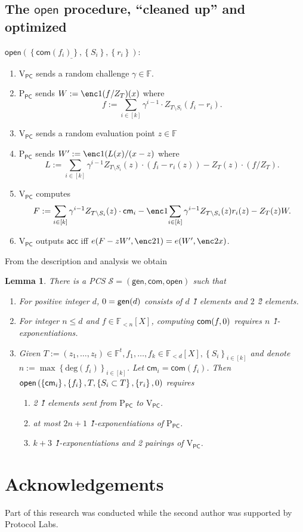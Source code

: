 \documentclass[11pt]{article} %
\newcommand{\F}{\ensuremath{\mathbb F}\xspace}
\newcommand{\com}{\ensuremath{\mathsf{com}}\xspace}
\newcommand{\cm}{\ensuremath{\mathsf{cm}}\xspace}
\newcommand{\open}{\ensuremath{\mathsf{open}}\xspace}
\renewcommand{\deg}{\ensuremath{\mathrm{deg}}\xspace}
\newcommand{\acc}{\ensuremath{\mathsf{acc}}\xspace}
\newcommand{\defeq}{:=}
\newcommand{\sett}[2]{\ensuremath{\set{#1}_{#2}}\xspace}
\newcommand{\gen}{\ensuremath{\mathsf{gen}}\xspace}
\newcommand{\prvpc}{\ensuremath{\mathrm{P_{\mathsf{PC}}}}\xspace}
\newcommand{\verpc}{\ensuremath{\mathrm{V_{\mathsf{PC}}}}\xspace}
\newcommand{\set}[1]{\ensuremath{\left\{#1\right\}}\xspace}
\newcommand{\polysofdeg}[1]{\ensuremath{\F_{< #1}[X]}\xspace}
\newcommand{\PCscheme}{\ensuremath{\mathscr{S}}\xspace}
\newtheorem{lemma}{Lemma}[section]
\begin{document}
 
 \subsection{The \open procedure, ``cleaned up'' and optimized}
 
$\underline{\open(\set{\com(f_i)},\set{S_i},\set{r_i})}$:
     \begin{enumerate}
    \item \verpc sends a random challenge $\gamma\in \F$.
    \item\label{stp:W} \prvpc sends $W\defeq \enc1{(f/Z_T)(x)}$ where
    \[f\defeq \sum_{i\in [k]} \gamma^{i-1}\cdot  Z_{T\setminus S_i}(f_i-r_i).\]
    \item \verpc sends a random evaluation point $z\in \F$
    \item\label{step:W'} \prvpc sends $W'\defeq \enc1{(L(x)/(x-z)}$ where
    \[L\defeq \sum_{i\in [k]} \gamma^{i-1}Z_{T\setminus S_i}(z)\cdot (f_i-r_i(z)) - Z_T(z)\cdot (f/Z_T).\]
    \item \verpc computes
     \[F\defeq \sum_{i\in [k]} \gamma^{i-1}  Z_{T\setminus S_i}(z)\cdot \cm_i - \enc1{\sum_{i\in [k]} \gamma^{i-1} Z_{T\setminus S_i}(z)r_i(z)} - Z_T(z)W.\]
    \item \verpc outputs \acc iff $e(F-zW',\enc2{1}) = e(W',\enc2{x})$.
    \end{enumerate}

From the description and analysis we obtain 
\begin{lemma}\label{lem:multikateG1}
There is a PCS $\PCscheme=(\gen,\com,\open)$ such that
  \begin{enumerate}
\item For positive integer $d$, $\srs0=\gen(d)$ consists of $d$ \G1 elements and $2$ \G2 elements.
  \item For integer $n\leq d$ and $f\in \polysofdeg{n}$, computing $\com(f,\srs0)$ requires $n$ \G1-exponentiations.
   \item Given $T \defeq (z_1,\ldots,z_t)\in \F^t, f_1,\ldots, f_k \in \polysofdeg{d}, \sett{S_i}{i\in [k]}$   and denote $n \defeq \max\sett{\deg(f_i)}{i\in [k]}$.
   Let $\cm_i = \com(f_i)$.
   Then $\open\left(\set{\cm_i},\set{f_i},T,\set{S_i\subset T},\set{r_i},\srs0 \right)$ requires

    \begin{enumerate}
    \item 2 \G1 elements sent from \prvpc to \verpc.
    \item at most $2n+1$ \G1-exponentiations of \prvpc.
    \item $k+3$ \G1-exponentiations and 2 pairings of \verpc.
\end{enumerate}
\end{enumerate}


\end{lemma}

\section*{Acknowledgements}
Part of this research was conducted while the second author was supported by Protocol Labs.


\end{document}
